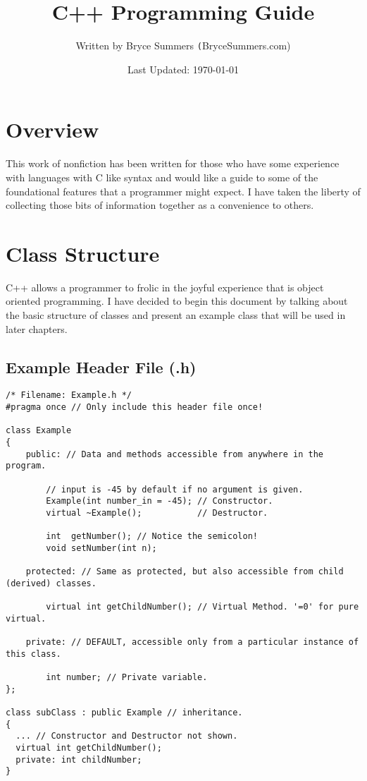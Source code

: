 \documentclass[12pt, letterpaper]{article}
\begin{document}
\title{\color{blue}C++ Programming Guide}
\author{Written by Bryce Summers \texttt(BryceSummers.com)}
\date{\color{red}Last Updated: \today}
\maketitle

\tableofcontents 

\newpage

\section{Overview}

This work of nonfiction has been written for those who have some experience with languages with C like syntax and would like a guide to some of the foundational features that a programmer might expect. I have taken the liberty of collecting those bits of information together as a convenience to others.

\section{Class Structure}

C++ allows a programmer to frolic in the joyful experience that is object oriented programming. I have decided to begin this document by talking about the basic structure of classes and present an example class that will be used in later chapters.

\subsection{Example Header File (.h)} \label{Example1}

\begin{verbatim}
/* Filename: Example.h */
#pragma once // Only include this header file once!

class Example
{
    public: // Data and methods accessible from anywhere in the program.

        // input is -45 by default if no argument is given.
       	Example(int number_in = -45); // Constructor.
        virtual ~Example();           // Destructor.

        int  getNumber(); // Notice the semicolon!
        void setNumber(int n);

    protected: // Same as protected, but also accessible from child (derived) classes.

        virtual int getChildNumber(); // Virtual Method. '=0' for pure virtual.

    private: // DEFAULT, accessible only from a particular instance of this class.

        int number; // Private variable.
};

class subClass : public Example // inheritance.
{
  ... // Constructor and Destructor not shown.
  virtual int getChildNumber();
  private: int childNumber;
}
\end{verbatim}
\end{document}
